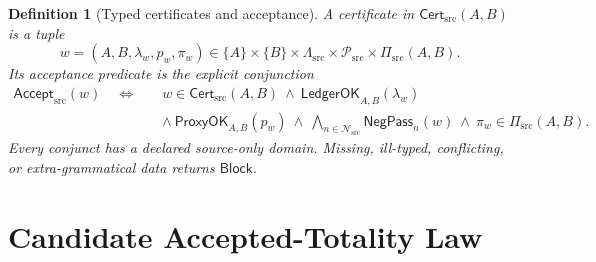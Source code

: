 \documentclass[11pt]{article}
\newtheorem{definition}{Definition}
\newcommand{\Cert}{\mathsf{Cert}_{\mathrm{src}}}
\newcommand{\Accept}{\mathsf{Accept}_{\mathrm{src}}}
\newcommand{\Block}{\mathsf{Block}}
\newcommand{\PiSrc}{\Pi_{\mathrm{src}}}
\begin{document}
\begin{definition}[Typed certificates and acceptance]
A certificate in \(\Cert(A,B)\) is a tuple
\[
 w=(A,B,\lambda_w,p_w,\pi_w)
 \in
 \{A\}\times\{B\}\times\Lambda_{\mathrm{src}}
 \times\mathcal P_{\mathrm{src}}\times\PiSrc(A,B).
\]
Its acceptance predicate is the explicit conjunction
\[
\begin{split}
 \Accept(w)\quad\Longleftrightarrow\quad&
 w\in\Cert(A,B)
 \ \wedge\ \mathsf{LedgerOK}_{A,B}(\lambda_w)\\
 &\wedge\ \mathsf{ProxyOK}_{A,B}(p_w)
 \ \wedge\
 \bigwedge_{n\in\mathcal N_{\mathrm{src}}}
 \mathsf{NegPass}_{n}(w)
 \ \wedge\ \pi_w\in\PiSrc(A,B).
\end{split}
\]
Every conjunct has a declared source-only domain. Missing, ill-typed,
conflicting, or extra-grammatical data returns \(\Block\).
\end{definition}

\section{Candidate Accepted-Totality Law}
\end{document}
